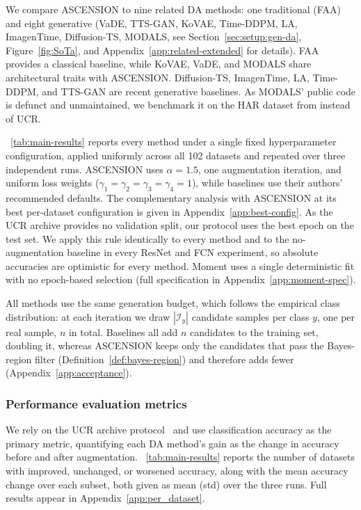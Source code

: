 We compare ASCENSION to nine related DA methods: one traditional
(FAA) and eight generative (VaDE, TTS-GAN, KoVAE, Time-DDPM, LA,
ImagenTime, Diffusion-TS, MODALS, see Section~\ref{sec:setup:gen-da},
Figure~\ref{fig:SoTa}, and Appendix~\ref{app:related-extended} for
details). FAA provides a classical baseline,
while KoVAE, VaDE, and MODALS share architectural traits with
ASCENSION. Diffusion-TS, ImagenTime, LA, Time-DDPM, and TTS-GAN
are recent generative baselines. As MODALS' public code is
defunct and unmaintained, we benchmark it on the HAR dataset from
\citep{cheung2020modals} instead of UCR.


\tablename~\ref{tab:main-results} reports every method under a
single fixed hyperparameter configuration, applied uniformly across
all 102 datasets and repeated over three independent runs. ASCENSION
uses $\alpha = 1.5$, one augmentation iteration, and uniform loss
weights ($\gamma_1 = \gamma_2 = \gamma_3 = \gamma_4 = 1$), while
baselines use their authors' recommended defaults. The complementary
analysis with ASCENSION at its best per-dataset configuration is
given in Appendix~\ref{app:best-config}.
As the UCR archive provides no validation split, our protocol uses
the best epoch on the test set. We apply this rule identically to
every method and to the no-augmentation baseline in every ResNet and
FCN experiment, so absolute accuracies are optimistic for every
method. Moment uses a single deterministic fit with no epoch-based
selection (full specification in Appendix~\ref{app:moment-spec}).

All methods use the same generation budget, which follows the
empirical class distribution: at each iteration we draw
$|\mathcal{I}_y|$ candidate samples per class $y$, one per real
sample, $n$ in total.
Baselines all add $n$ candidates to the training set, doubling it,
whereas ASCENSION keeps only the candidates that pass the
Bayes-region filter (Definition~\ref{def:bayes-region}) and therefore
adds fewer (Appendix~\ref{app:acceptance}).



\subsubsection{Performance evaluation metrics}
\label{sec:results:metrics}

We rely on the UCR archive protocol~\citep{dau2019ucr} and use
classification accuracy as the primary metric, quantifying each
DA method's gain as the change in accuracy before and after
augmentation.
\tablename~\ref{tab:main-results} reports the number of datasets with
improved, unchanged, or worsened accuracy, along with the mean
accuracy change over each subset, both given as mean (std) over the
three runs. Full results appear in Appendix~\ref{app:per_dataset}.


